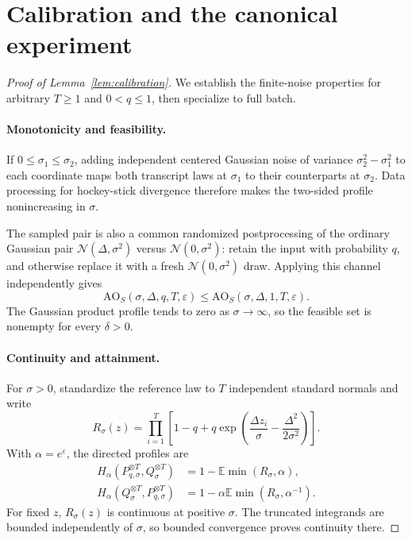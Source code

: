 \documentclass[11pt]{article}
\theoremstyle{remark}
\newcommand{\E}{\mathbb E}
\newcommand{\Normal}{\mathcal N}
\newcommand{\AO}{\mathrm{AO}}
\begin{document}
\section{Calibration and the canonical experiment}\label{app:calibration}
\begin{proof}[Proof of Lemma~\ref{lem:calibration}]
We establish the finite-noise properties for arbitrary $T\geq1$ and
$0<q\leq1$, then specialize to full batch.

\paragraph{Monotonicity and feasibility.}
If $0\leq\sigma_1\leq\sigma_2$, adding independent centered Gaussian noise of
variance $\sigma_2^2-\sigma_1^2$ to each coordinate maps both transcript laws
at $\sigma_1$ to their counterparts at $\sigma_2$. Data processing for
hockey-stick divergence therefore makes the two-sided profile nonincreasing
in $\sigma$.

The sampled pair is also a common randomized postprocessing of the ordinary
Gaussian pair $\Normal(\Delta,\sigma^2)$ versus $\Normal(0,\sigma^2)$: retain
the input with probability $q$, and otherwise replace it with a fresh
$\Normal(0,\sigma^2)$ draw. Applying this channel independently gives
\[
 \AO_S(\sigma,\Delta,q,T,\varepsilon)
 \leq
 \AO_S(\sigma,\Delta,1,T,\varepsilon).
\]
The Gaussian product profile tends to zero as $\sigma\to\infty$, so the
feasible set is nonempty for every $\delta>0$.

\paragraph{Continuity and attainment.}
For $\sigma>0$, standardize the reference law to $T$ independent standard
normals and write
\[
 R_\sigma(z)=\prod_{i=1}^T
 \left[1-q+q\exp\left(\frac{\Delta z_i}{\sigma}
                         -\frac{\Delta^2}{2\sigma^2}\right)\right].
\]
With $\alpha=e^\varepsilon$, the directed profiles are
\begin{align*}
 H_\alpha(P_{q,\sigma}^{\otimes T}, Q_\sigma^{\otimes T})
 &=1-\E\min(R_\sigma,\alpha),\\
 H_\alpha(Q_\sigma^{\otimes T}, P_{q,\sigma}^{\otimes T})
 &=1-\alpha\E\min(R_\sigma,\alpha^{-1}).
\end{align*}
For fixed $z$, $R_\sigma(z)$ is continuous at positive $\sigma$. The truncated
integrands are bounded independently of $\sigma$, so bounded convergence
proves continuity there.


\end{proof}
\end{document}
